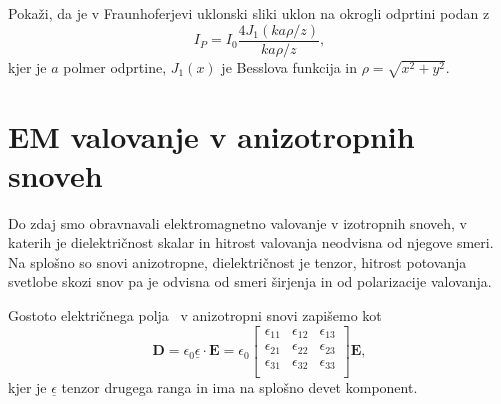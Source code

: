 \begin{definition}
\label{naloga-Frauhofer-Kirchhoff-uklon}
Pokaži, da je v Fraunhoferjevi uklonski sliki uklon na okrogli odprtini podan z
\begin{equation}
I_P = I_0\frac{4 J_1(k a \rho/ z)}{k a \rho/z},
\end{equation}
kjer je $a$ polmer odprtine, $J_1(x)$ je Besslova funkcija in $\rho = \sqrt{x^2+y^2}$.
\end{definition}

\section{EM valovanje v anizotropnih snoveh}\label{chap:anizotropni}
Do zdaj smo obravnavali elektromagnetno valovanje
v izotropnih snoveh, v katerih je dielektričnost skalar in hitrost 
valovanja neodvisna od njegove smeri. Na splošno so snovi anizotropne,
dielektričnost je tenzor, hitrost potovanja svetlobe 
skozi snov pa je odvisna od smeri širjenja in od polarizacije valovanja. 

Gostoto električnega polja~ v anizotropni snovi zapišemo kot 
\begin{equation}
\mathbf{D}=\epsilon_{0}\underline{\epsilon} \cdot\mathbf{E} = 
\epsilon_{0}
\left[\begin{array}{ccc}
\epsilon_{11} & \epsilon_{12}& \epsilon_{13}\\
\epsilon_{21} & \epsilon_{22}& \epsilon_{23}\\
\epsilon_{31} & \epsilon_{32}& \epsilon_{33}\\
\end{array}\right]\mathbf{E},
\label{eq:gostota-elektricnega-polja-tenzor}
\end{equation}
kjer je $\underline{\epsilon}$ tenzor drugega ranga in ima na splošno devet komponent.

